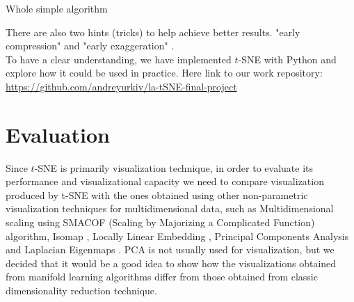 \begin{algorithm}[H] %
\caption{Whole simple algorithm \cite{tsnearticle}}
\SetAlgoLined
{}
\end{algorithm}

There are also two hints (tricks) to help achieve better results. "early compression" and "early exaggeration" \cite{tsnearticle}.\\

To have a clear understanding, we have implemented $t$-SNE with Python and explore how it could be used in practice. Here link to our work repository:\\

\url{https://github.com/andreyurkiv/la-tSNE-final-project}

\section{Evaluation}

Since $t$-SNE is primarily visualization technique, in order to evaluate its performance and visualizational capacity we need to compare visualization produced by t-SNE with the ones obtained using other non-parametric visualization techniques for multidimensional data, such as Multidimensional scaling \cite{mds} using SMACOF (Scaling by Majorizing a Complicated Function) algorithm, Isomap \cite{isomap}, Locally Linear Embedding \cite{lle}, Principal Components Analysis \cite{pca} and Laplacian Eigenmaps \cite{lapeig}. PCA is not usually used for visualization, but we decided that it would be a good idea to show how the visualizations obtained from manifold learning algorithms differ from those obtained from classic dimensionality reduction technique.


